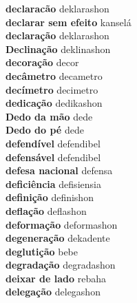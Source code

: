 \textbf{ declaracão  } deklarashon \\
\textbf{ declarar sem efeito  } kanselá \\
\textbf{ declaração  } deklarashon \\
\textbf{ Declinação  } deklinashon \\
\textbf{ decoração  } decor \\
\textbf{ decâmetro  } decametro \\
\textbf{ decímetro  } decimetro \\
\textbf{ dedicação  } dedikashon \\
\textbf{ Dedo da mão  } dede \\
\textbf{ Dedo do pé  } dede \\
\textbf{ defendível  } defendibel \\
\textbf{ defensável  } defendibel \\
\textbf{ defesa nacional  } defensa \\
\textbf{ deficiência  } defisiensia \\
\textbf{ definição  } definishon \\
\textbf{ deflação  } deflashon \\
\textbf{ deformação  } deformashon \\
\textbf{ degeneração  } dekadente \\
\textbf{ deglutição  } bebe \\
\textbf{ degradação  } degradashon \\
\textbf{ deixar de lado  } rebaha \\
\textbf{ delegação  } delegashon \\
